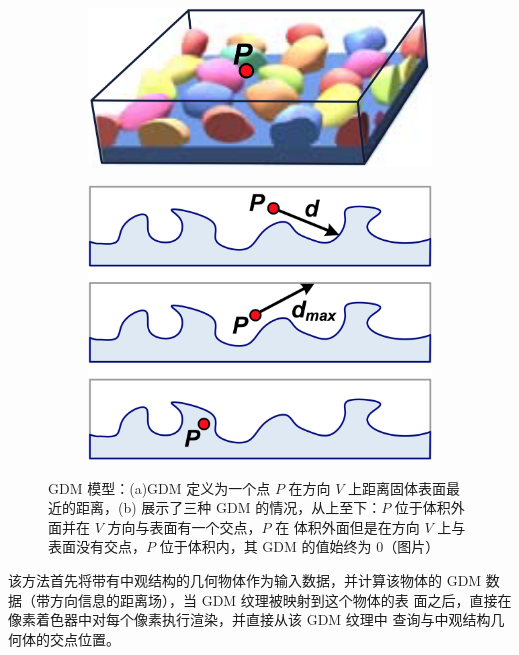 \begin{figure}
\begin{center}
	\begin{subfigure}[b]{0.4\textwidth}
		\includegraphics[width=\textwidth]{figures/df/GDM-model-1}
		\caption{}
	\end{subfigure}
	\begin{subfigure}[b]{0.4\textwidth}
		\includegraphics[width=\textwidth]{figures/df/GDM-model-2}
		\caption{}
	\end{subfigure}
\end{center}
	\caption{GDM 模型：(a)GDM 定义为一个点 $P$ 在方向 $V$ 上距离固体表面最近的距离，(b) 展示了三种 GDM 的情况，从上至下：$P$ 位于体积外面并在 $V$ 方向与表面有一个交点，$P$ 在 体积外面但是在方向 $V$ 上与表面没有交点，$P$ 位于体积内，其 GDM 的值始终为 0（图片\cite{a:GeneralizedDisplacementMaps}）}
	\label{f:df-GDM-model}
\end{figure}

该方法首先将带有中观结构的几何物体作为输入数据，并计算该物体的 GDM 数据（带方向信息的距离场），当 GDM 纹理被映射到这个物体的表 面之后，直接在像素着色器中对每个像素执行渲染，并直接从该 GDM 纹理中 查询与中观结构几何体的交点位置。

